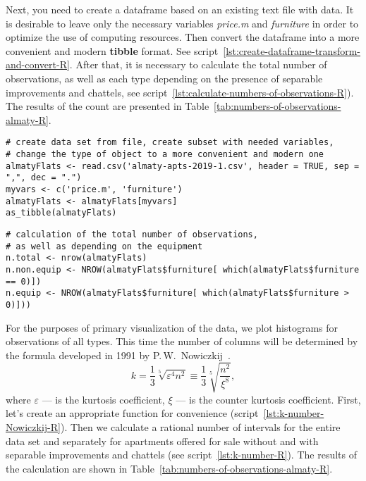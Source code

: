 \documentclass[]{scrreprt}
\begin{document}
Next, you need to create a dataframe based on an existing text file with data. It is desirable to leave only the necessary variables \textit{price.m} and \textit{furniture} in order to optimize the use of computing resources. Then convert the dataframe into a more convenient and modern \textbf{tibble} format. See script~\ref{lst:create-dataframe-transform-and-convert-R}. After that, it is necessary to calculate the total number of observations, as well as each type depending on the presence of separable improvements and chattels, see script~\ref{lst:calculate-numbers-of-observations-R}). The results of the count are presented in Table~\ref{tab:numbers-of-observations-almaty-R}.
%
\begin{lstlisting}[float=htp, caption = Creating a dataframe and setting it up, firstnumber=1, label= lst:create-dataframe-transform-and-convert-R]
# create data set from file, create subset with needed variables,
# change the type of object to a more convenient and modern one
almatyFlats <- read.csv('almaty-apts-2019-1.csv', header = TRUE, sep = ",", dec = ".")
myvars <- c('price.m', 'furniture')
almatyFlats <- almatyFlats[myvars]
as_tibble(almatyFlats)
\end{lstlisting} 
%
\begin{lstlisting}[float=htp, caption = Counting the number of observations, firstnumber=1, label= lst:calculate-numbers-of-observations-R]
# calculation of the total number of observations,
# as well as depending on the equipment 
n.total <- nrow(almatyFlats)
n.non.equip <- NROW(almatyFlats$furniture[ which(almatyFlats$furniture == 0)])
n.equip <- NROW(almatyFlats$furniture[ which(almatyFlats$furniture > 0)]))
\end{lstlisting}
%
For the purposes of primary visualization of the data, we plot histograms for observations of all types. This time the number of columns will be determined by the formula developed in 1991 by P.\,W.~Nowiczkij~\cite{Nowiczkij:oczenka-pogresh}.
\begin{equation}\label{eq:k-hist_Nowiczkij}
k = \frac{1}{3}\sqrt[5]{\varepsilon^4 n^2} \equiv \frac{1}{3} \sqrt[5]{\frac{n^2}{\xi^8}}, 
\end{equation}
where $\varepsilon$ --- is the kurtosis coefficient, $\xi$ --- is the counter kurtosis coefficient. First, let's create an appropriate function for convenience  (script~\ref{lst:k-number-Nowiczkij-R}). Then we calculate a rational number of intervals for the entire data set and separately for apartments offered for sale without and with separable improvements and chattels (see script~\ref{lst:k-number-R}). The results of the calculation are shown in Table~\ref{tab:numbers-of-observations-almaty-R}.
\end{document}
